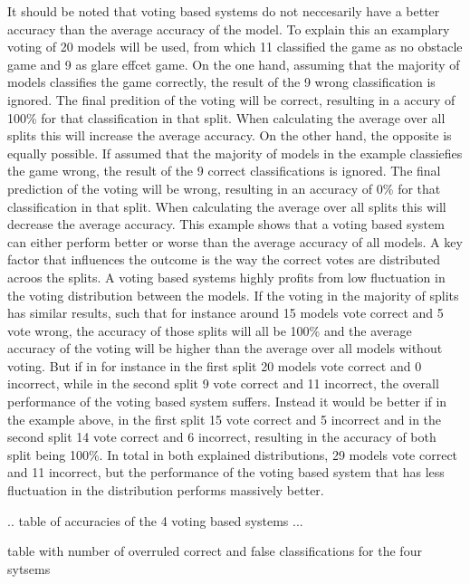 It should be noted that voting based systems do not neccesarily have a better accuracy than the average accuracy of the model. To explain this an examplary voting of 20 models will be used, from which 11 classified the game as no obstacle game and 9 as glare effcet game. On the one hand, assuming that the majority of models classifies the game correctly, the result of the 9 wrong classification is ignored. The final predition of the voting will be correct, resulting in a accury of 100\% for that classification in that split. When calculating the average over all splits this will increase the average accuracy. On the other hand, the opposite is equally possible. If assumed that the majority of models in the example classiefies the game wrong, the result of the 9 correct classifications is ignored. The final prediction of the voting will be wrong, resulting in an accuracy of 0\% for that classification in that split. When calculating the average over all splits this will decrease the average accuracy. This example shows that a voting based system can either perform better or worse than the average accuracy of all models. A key factor that influences the outcome is the way the correct votes are distributed acroos the splits. A voting based systems highly profits from low fluctuation in the voting distribution between the models. If the voting in the majority of splits has similar results, such that for instance around 15 models vote correct and 5 vote wrong, the accuracy of those splits will all be 100\% and the average accuracy of the voting will be higher than the average over all models without voting. But if in for instance in the first split 20 models vote correct and 0 incorrect, while in the second split 9 vote correct and 11 incorrect, the overall performance of the voting based system suffers. Instead it would be better if in the example above, in the first split 15 vote correct and 5 incorrect and in the second split 14 vote correct and 6 incorrect, resulting in the accuracy of both split being 100\%. In total in both explained distributions, 29 models vote correct and 11 incorrect, but the performance of the voting based system that has less fluctuation in the distribution performs massively better. 




.. table of accuracies of the 4 voting based systems ...

table with number of overruled correct and false classifications for the four sytsems 



